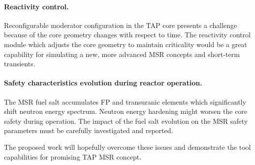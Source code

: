 \paragraph{Reactivity control.} Reconfigurable moderator configuration in the 
\gls{TAP} core presents a challenge because of the core geometry changes with 
respect to time. The reactivity control module which adjusts the core geometry 
to maintain criticality would be a great capability for simulating a new, more 
advanced \gls{MSR} concepts and short-term transients.
\paragraph{Safety characteristics evolution during reactor operation.} The 
\gls{MSR} fuel salt  accumulates \gls{FP} and transuranic elements which 
significantly shift neutron energy spectrum. Neutron energy hardening might 
worsen the core safety during operation. The impact of the fuel salt evolution 
on the \gls{MSR} safety parameters must be carefully investigated and reported.

The proposed work will hopefully overcome these issues and demonstrate the 
tool capabilities for promising \gls{TAP} \gls{MSR} concept.
